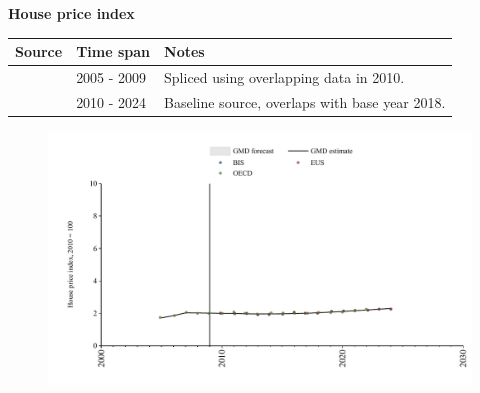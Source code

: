 \documentclass[12pt,a4paper,landscape]{article}
\begin{document}
\begin{adjustbox}{max totalsize={\paperwidth}{\paperheight},center}
\begin{minipage}[t][\textheight][t]{\textwidth}
\vspace*{0.5cm}
{}
\begin{center}
{\Large\bfseries House price index}
\end{center}
\vspace{0.5cm}
\begin{table}[H]
\centering
\small
\begin{tabular}{|l|l|l|}
\hline
\textbf{Source} & \textbf{Time span} & \textbf{Notes} \\
\hline
\rowcolor{white}\cite{OECD}& 2005 - 2009 &Spliced using overlapping data in 2010. \\
\rowcolor{lightgray}\cite{BIS}& 2010 - 2024 &Baseline source, overlaps with base year 2018. \\
\hline
\end{tabular}
\end{table}
\begin{figure}[H]
\centering
\includegraphics[width=\textwidth,height=0.6\textheight,keepaspectratio]{graphs/POL_HPI.pdf}
\end{figure}
\end{minipage}
\end{adjustbox}
\end{document}
